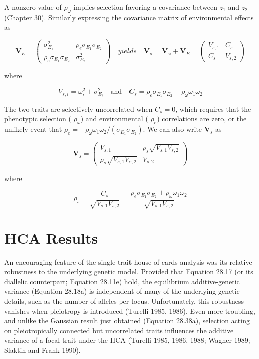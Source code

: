 \documentclass{article}
\begin{document}
A nonzero value of  $ \rho_{\omega} $ implies selection favoring a covariance between  $ z_{1} $ and  $ z_{2} $ (Chapter 30). Similarly expressing the covariance matrix of environmental effects as

\begin{equation}
\mathbf{V}_{E}=\begin{pmatrix}\sigma_{E_{1}}^{2}&\rho_{e}\sigma_{E_{1}}\sigma_{E_{2}}\\\rho_{e}\sigma_{E_{1}}\sigma_{E_{2}}&\sigma_{E_{2}}^{2}\end{pmatrix}\quad yields\quad\mathbf{V}_{s}=\mathbf{V}_{\omega}+\mathbf{V}_{E}=\begin{pmatrix}V_{s,1}&C_{s}\\C_{s}&V_{s,2}\end{pmatrix}
\end{equation}

where

\begin{equation}
V_{s,i}=\omega_{i}^{2}+\sigma_{E_{i}}^{2}\quad\mathrm{a n d}\quad C_{s}=\rho_{e}\sigma_{E_{1}}\sigma_{E_{2}}+\rho_{\omega}\omega_{1}\omega_{2}
\tag{28.39a}
\label{eq:28_39a}
\end{equation}

The two traits are selectively uncorrelated when  $ C_s = 0 $, which requires that the phenotypic selection ( $ \rho_\omega $) and environmental ( $ \rho_e $) correlations are zero, or the unlikely event that  $ \rho_e = -\rho_\omega \omega_1 \omega_2 / (\sigma_{E_1} \sigma_{E_2}) $. We can also write  $ \mathbf{V}_s $ as

\begin{equation}
\mathbf{V}_{s}=\begin{pmatrix}V_{s,1}&\rho_{s}\sqrt{V_{s,1}V_{s,2}}\\ \rho_{s}\sqrt{V_{s,1}V_{s,2}}&V_{s,2}\end{pmatrix}
\end{equation}

where

\begin{equation}
\rho_{s}=\frac{C_{s}}{\sqrt{V_{s,1}V_{s,2}}}=\frac{\rho_{e}\sigma_{E_{1}}\sigma_{E_{2}}+\rho_{\omega}\omega_{1}\omega_{2}}{\sqrt{V_{s,1}V_{s,2}}}
\tag{28.39b}
\label{eq:28_39b}
\end{equation}

\section{HCA Results}
An encouraging feature of the single-trait house-of-cards analysis was its relative robustness to the underlying genetic model. Provided that Equation 28.17 (or its diallelic counterpart; Equation 28.11e) hold, the equilibrium additive-genetic variance (Equation 28.18a) is independent of many of the underlying genetic details, such as the number of alleles per locus. Unfortunately, this robustness vanishes when pleiotropy is introduced (Turelli 1985, 1986). Even more troubling, and unlike the Gaussian result just obtained (Equation 28.38a), selection acting on pleiotropically connected but uncorrelated traits influences the additive variance of a focal trait under the HCA (Turelli 1985, 1986, 1988; Wagner 1989; Slaktin and Frank 1990).
\end{document}
